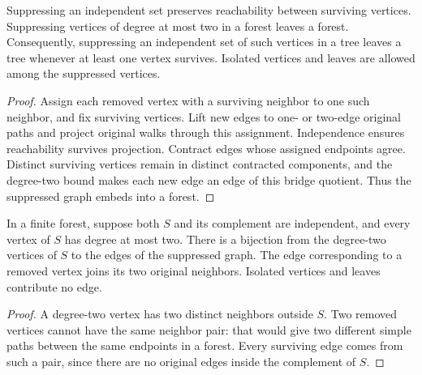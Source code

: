 \begin{theorem}
  \label{thm:lowerbounds-algebraic-path-suppression}
  \leanok
  Suppressing an independent set preserves reachability between surviving
  vertices. Suppressing vertices of degree at most two in a forest leaves
  a forest. Consequently, suppressing an independent set of such vertices
  in a tree leaves a tree whenever at least one vertex survives. Isolated
  vertices and leaves are allowed among the suppressed vertices.
\end{theorem}
\begin{proof}
  \leanok
  Assign each removed vertex with a surviving neighbor to one such
  neighbor, and fix surviving vertices. Lift new edges to one- or two-edge
  original paths and project original walks through this assignment.
  Independence ensures reachability survives projection.
  Contract edges whose assigned endpoints agree. Distinct surviving
  vertices remain in distinct contracted components, and the degree-two
  bound makes each new edge an edge of this bridge quotient. Thus the
  suppressed graph embeds into a forest.
\end{proof}

\begin{theorem}
  \label{thm:lowerbounds-algebraic-path-suppression-count}
  \leanok
  In a finite forest, suppose both $S$ and its complement are independent,
  and every vertex of $S$ has degree at most two. There is a bijection
  from the degree-two vertices of $S$ to the edges of the suppressed graph.
  The edge corresponding to a removed vertex joins its two original
  neighbors. Isolated vertices and leaves contribute no edge.
\end{theorem}
\begin{proof}
  \leanok
  A degree-two vertex has two distinct neighbors outside $S$.
  Two removed vertices cannot have the same neighbor pair: that would
  give two different simple paths between the same endpoints in a forest.
  Every surviving edge comes from such a pair, since there are no original
  edges inside the complement of $S$.
\end{proof}

